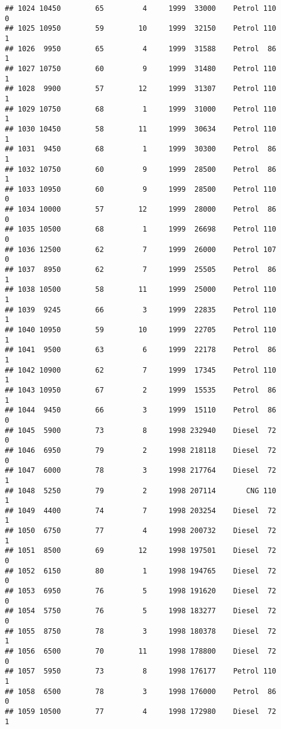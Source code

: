 \documentclass[]{article}
\begin{document}
\begin{verbatim}
## 1024 10450        65         4     1999  33000    Petrol 110         0
## 1025 10950        59        10     1999  32150    Petrol 110         1
## 1026  9950        65         4     1999  31588    Petrol  86         1
## 1027 10750        60         9     1999  31480    Petrol 110         1
## 1028  9900        57        12     1999  31307    Petrol 110         1
## 1029 10750        68         1     1999  31000    Petrol 110         1
## 1030 10450        58        11     1999  30634    Petrol 110         1
## 1031  9450        68         1     1999  30300    Petrol  86         1
## 1032 10750        60         9     1999  28500    Petrol  86         1
## 1033 10950        60         9     1999  28500    Petrol 110         0
## 1034 10000        57        12     1999  28000    Petrol  86         0
## 1035 10500        68         1     1999  26698    Petrol 110         0
## 1036 12500        62         7     1999  26000    Petrol 107         0
## 1037  8950        62         7     1999  25505    Petrol  86         1
## 1038 10500        58        11     1999  25000    Petrol 110         1
## 1039  9245        66         3     1999  22835    Petrol 110         1
## 1040 10950        59        10     1999  22705    Petrol 110         1
## 1041  9500        63         6     1999  22178    Petrol  86         1
## 1042 10900        62         7     1999  17345    Petrol 110         1
## 1043 10950        67         2     1999  15535    Petrol  86         1
## 1044  9450        66         3     1999  15110    Petrol  86         0
## 1045  5900        73         8     1998 232940    Diesel  72         0
## 1046  6950        79         2     1998 218118    Diesel  72         0
## 1047  6000        78         3     1998 217764    Diesel  72         1
## 1048  5250        79         2     1998 207114       CNG 110         1
## 1049  4400        74         7     1998 203254    Diesel  72         1
## 1050  6750        77         4     1998 200732    Diesel  72         1
## 1051  8500        69        12     1998 197501    Diesel  72         0
## 1052  6150        80         1     1998 194765    Diesel  72         0
## 1053  6950        76         5     1998 191620    Diesel  72         0
## 1054  5750        76         5     1998 183277    Diesel  72         0
## 1055  8750        78         3     1998 180378    Diesel  72         1
## 1056  6500        70        11     1998 178800    Diesel  72         0
## 1057  5950        73         8     1998 176177    Petrol 110         1
## 1058  6500        78         3     1998 176000    Petrol  86         0
## 1059 10500        77         4     1998 172980    Diesel  72         1

\end{verbatim}
\end{document}
